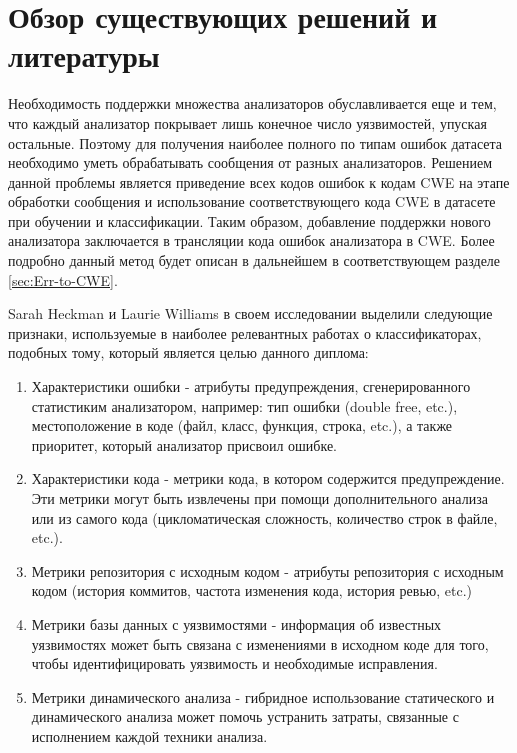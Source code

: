 \section{Обзор существующих решений и литературы}
\label{sec:Chapter2} 

Необходимость поддержки множества анализаторов обуславливается еще и тем, что каждый анализатор покрывает лишь конечное число уязвимостей, упуская остальные\cite{Delaitre2013OfMS, 3291, Bessey2010AFB}. Поэтому для получения наиболее полного по типам ошибок датасета необходимо уметь обрабатывать сообщения от разных анализаторов. Решением данной проблемы является приведение всех кодов ошибок к кодам CWE \cite{CWE-doc} на этапе обработки сообщения и использование соответствующего кода CWE в датасете при обучении и классификации. Таким образом, добавление поддержки нового анализатора заключается в трансляции кода ошибок анализатора в CWE. Более подробно данный метод будет описан в дальнейшем в соответствующем разделе \ref{sec:Err-to-CWE}.

Sarah Heckman и Laurie Williams в своем исследовании\cite{HECKMAN2011363} выделили следующие признаки, используемые в наиболее релевантных работах о классификаторах, подобных тому, который является целью данного диплома:
\begin{enumerate}
    \item Характеристики ошибки - атрибуты предупреждения, сгенерированного статистиким анализатором, например: тип ошибки (double free, etc.), местоположение в коде (файл, класс, функция, строка, etc.), а также приоритет, который анализатор присвоил ошибке.
    \item Характеристики кода - метрики кода, в котором содержится предупреждение. Эти метрики могут быть извлечены при помощи дополнительного анализа или из самого кода (цикломатическая сложность, количество строк в файле, etc.).
    \item Метрики репозитория с исходным кодом - атрибуты репозитория с исходным кодом (история коммитов, частота изменения кода, история ревью, etc.)
    \item Метрики базы данных с уязвимостями - информация об известных уязвимостях может быть связана с изменениями в исходном коде для того, чтобы идентифицировать уязвимость и необходимые исправления.
    \item Метрики динамического анализа - гибридное использование статического и динамического анализа может помочь устранить затраты, связанные с исполнением каждой техники анализа.
\end{enumerate}

